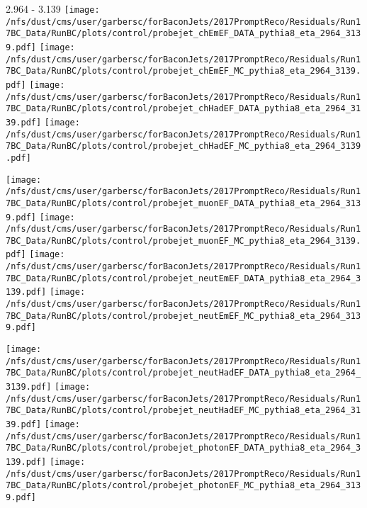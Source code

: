 \documentclass[t,compress]{beamer}
\begin{document}
\begin{frame}{2.964 - 3.139}
	\texttt{[image: /nfs/dust/cms/user/garbersc/forBaconJets/2017PromptReco/Residuals/Run17BC\_Data/RunBC/plots/control/probejet\_chEmEF\_DATA\_pythia8\_eta\_2964\_3139.pdf]}
	\texttt{[image: /nfs/dust/cms/user/garbersc/forBaconJets/2017PromptReco/Residuals/Run17BC\_Data/RunBC/plots/control/probejet\_chEmEF\_MC\_pythia8\_eta\_2964\_3139.pdf]}
	\texttt{[image: /nfs/dust/cms/user/garbersc/forBaconJets/2017PromptReco/Residuals/Run17BC\_Data/RunBC/plots/control/probejet\_chHadEF\_DATA\_pythia8\_eta\_2964\_3139.pdf]}
	\texttt{[image: /nfs/dust/cms/user/garbersc/forBaconJets/2017PromptReco/Residuals/Run17BC\_Data/RunBC/plots/control/probejet\_chHadEF\_MC\_pythia8\_eta\_2964\_3139.pdf]}
\newline

\vspace{-0.65cm}
	\texttt{[image: /nfs/dust/cms/user/garbersc/forBaconJets/2017PromptReco/Residuals/Run17BC\_Data/RunBC/plots/control/probejet\_muonEF\_DATA\_pythia8\_eta\_2964\_3139.pdf]}
	\texttt{[image: /nfs/dust/cms/user/garbersc/forBaconJets/2017PromptReco/Residuals/Run17BC\_Data/RunBC/plots/control/probejet\_muonEF\_MC\_pythia8\_eta\_2964\_3139.pdf]}
	\texttt{[image: /nfs/dust/cms/user/garbersc/forBaconJets/2017PromptReco/Residuals/Run17BC\_Data/RunBC/plots/control/probejet\_neutEmEF\_DATA\_pythia8\_eta\_2964\_3139.pdf]}
	\texttt{[image: /nfs/dust/cms/user/garbersc/forBaconJets/2017PromptReco/Residuals/Run17BC\_Data/RunBC/plots/control/probejet\_neutEmEF\_MC\_pythia8\_eta\_2964\_3139.pdf]}
\newline

\vspace{-0.65cm}
	\texttt{[image: /nfs/dust/cms/user/garbersc/forBaconJets/2017PromptReco/Residuals/Run17BC\_Data/RunBC/plots/control/probejet\_neutHadEF\_DATA\_pythia8\_eta\_2964\_3139.pdf]}
	\texttt{[image: /nfs/dust/cms/user/garbersc/forBaconJets/2017PromptReco/Residuals/Run17BC\_Data/RunBC/plots/control/probejet\_neutHadEF\_MC\_pythia8\_eta\_2964\_3139.pdf]}
	\texttt{[image: /nfs/dust/cms/user/garbersc/forBaconJets/2017PromptReco/Residuals/Run17BC\_Data/RunBC/plots/control/probejet\_photonEF\_DATA\_pythia8\_eta\_2964\_3139.pdf]}
	\texttt{[image: /nfs/dust/cms/user/garbersc/forBaconJets/2017PromptReco/Residuals/Run17BC\_Data/RunBC/plots/control/probejet\_photonEF\_MC\_pythia8\_eta\_2964\_3139.pdf]}
\end{frame}
\end{document}
